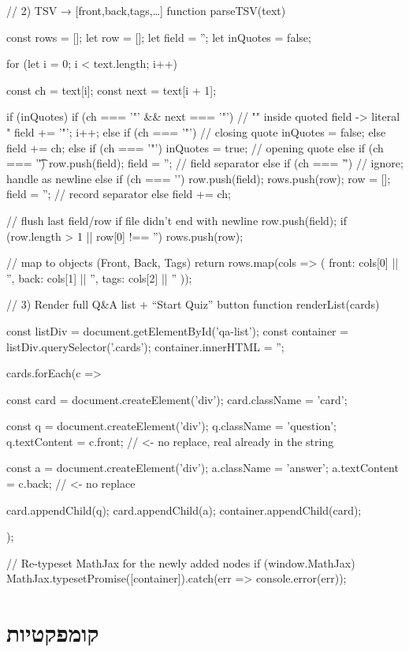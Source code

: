 \documentclass{tstextbook}
\begin{document}
    // 2) TSV → [{front,back,tags},…]
    function parseTSV(text) {
  const rows = [];
  let row = [];
  let field = '';
  let inQuotes = false;

  for (let i = 0; i < text.length; i++) {
    const ch = text[i];
    const next = text[i + 1];

    if (inQuotes) {
      if (ch === '"' && next === '"') {
        // "" inside quoted field -> literal "
        field += '"';
        i++;
      } else if (ch === '"') {
        // closing quote
        inQuotes = false;
      } else {
        field += ch;
      }
    } else {
      if (ch === '"') {
        inQuotes = true;                // opening quote
      } else if (ch === '\t') {
        row.push(field); field = '';    // field separator
      } else if (ch === '\r') {
        // ignore; handle \n as newline
      } else if (ch === '\n') {
        row.push(field); rows.push(row);
        row = []; field = '';           // record separator
      } else {
        field += ch;
      }
    }
  }
  // flush last field/row if file didn't end with newline
  row.push(field);
  if (row.length > 1 || row[0] !== '') rows.push(row);

  // map to objects (Front, Back, Tags)
  return rows.map(cols => ({
    front: cols[0] || '',
    back:  cols[1] || '',
    tags:  cols[2] || ''
  }));
}
// 3) Render full Q&A list + “Start Quiz” button
function renderList(cards) {
  const listDiv = document.getElementById('qa-list');
  const container = listDiv.querySelector('.cards');
  container.innerHTML = '';

  cards.forEach(c => {
    const card = document.createElement('div');
    card.className = 'card';

    const q = document.createElement('div');
    q.className = 'question';
    q.textContent = c.front;   // <- no replace, real \n already in the string

    const a = document.createElement('div');
    a.className = 'answer';
    a.textContent = c.back;    // <- no replace

    card.appendChild(q);
    card.appendChild(a);
    container.appendChild(card);
  });

  // Re-typeset MathJax for the newly added nodes
  if (window.MathJax) {
    MathJax.typesetPromise([container]).catch(err => console.error(err));
  }
}
  \chapter{קומפקטיות}
\end{document}
